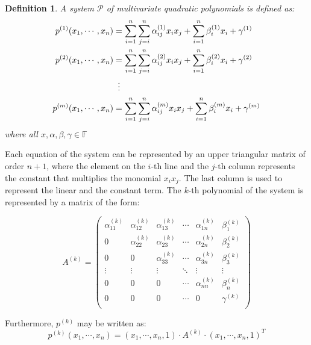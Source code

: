 \documentclass{ufsctex/ufsctex}
\newtheorem{definition}{Definition}
\begin{document}
\begin{definition}\label{def:mqsystem}
A system $\mathcal{P}$ of multivariate quadratic polynomials is defined as:
\begin{equation}\label{eq:mqsystem}
\begin{split}
p^{(1)}(x_1,\cdots,x_n) &= \sum_{i=1}^n \sum_{j=i}^n \alpha^{(1)}_{ij} x_i x_j
	+ \sum_{i=1}^n \beta^{(1)}_i x_i + \gamma^{(1)} \\
p^{(2)}(x_1,\cdots,x_n) &= \sum_{i=1}^n \sum_{j=i}^n \alpha^{(2)}_{ij} x_i x_j
	+ \sum_{i=1}^n \beta^{(2)}_i x_i + \gamma^{(2)} \\
&\vdotswithin{=} \\
p^{(m)}(x_1,\cdots,x_n) &= \sum_{i=1}^n \sum_{j=i}^n \alpha^{(m)}_{ij} x_i x_j
	+ \sum_{i=1}^n \beta^{(m)}_i x_i + \gamma^{(m)}
\end{split}
\end{equation}
where all $x, \alpha, \beta, \gamma \in \mathbb{F}$
\end{definition}

Each equation of the system can be represented by an upper triangular matrix of
order $n+1$, where the element on the $i$-th line and the $j$-th column
represents the constant that multiplies the monomial $x_i x_j$. The last column
is used to represent the linear and the constant term. The $k$-th polynomial of
the system is represented by a matrix of the form:

\begin{equation}\label{eq:matrixrepresentation}
A^{(k)} =
\begin{pmatrix}
\alpha^{(k)}_{11} & \alpha^{(k)}_{12} & \alpha^{(k)}_{13} & \cdots &
	\alpha^{(k)}_{1n} & \beta^{(k)}_1 \\
0 & \alpha^{(k)}_{22} & \alpha^{(k)}_{23} & \cdots &
	\alpha^{(k)}_{2n} & \beta^{(k)}_2 \\
0 & 0 & \alpha^{(k)}_{33} & \cdots &
	\alpha^{(k)}_{3n} & \beta^{(k)}_3 \\
\vdots & \vdots & \vdots & \ddots & \vdots & \vdots \\
0 & 0 & 0 & \cdots & \alpha^{(k)}_{nn} & \beta^{(k)}_n \\
0 & 0 & 0 & \cdots & 0 & \gamma^{(k)} \\
\end{pmatrix}
\end{equation}

Furthermore, $p^{(k)}$ may be written as:
\begin{equation}
p^{(k)}(x_1,\cdots,x_n) =
	(x_1,\cdots,x_n,1) \cdot A^{(k)} \cdot (x_1,\cdots,x_n,1)^T
\end{equation}
\end{document}
